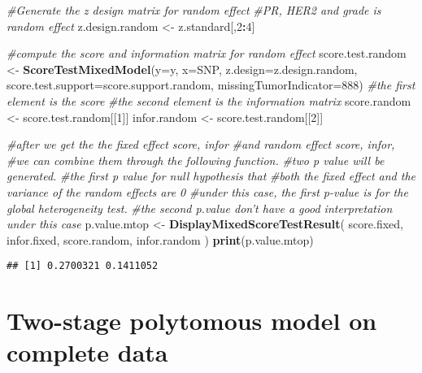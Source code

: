 \documentclass[11pt,]{article}
\newenvironment{Shaded}{\begin{snugshade}}{\end{snugshade}}
\newcommand{\KeywordTok}[1]{\textcolor[rgb]{0.13,0.29,0.53}{\textbf{#1}}}
\newcommand{\DataTypeTok}[1]{\textcolor[rgb]{0.13,0.29,0.53}{#1}}
\newcommand{\DecValTok}[1]{\textcolor[rgb]{0.00,0.00,0.81}{#1}}
\newcommand{\StringTok}[1]{\textcolor[rgb]{0.31,0.60,0.02}{#1}}
\newcommand{\CommentTok}[1]{\textcolor[rgb]{0.56,0.35,0.01}{\textit{#1}}}
\newcommand{\OperatorTok}[1]{\textcolor[rgb]{0.81,0.36,0.00}{\textbf{#1}}}
\newcommand{\NormalTok}[1]{#1}
\begin{document}
\begin{Shaded}
\begin{Highlighting}[]
\CommentTok{#Generate the z design matrix for random effect}
\CommentTok{#PR, HER2 and grade is random effect}
\NormalTok{z.design.random <-}\StringTok{ }\NormalTok{z.standard[,}\DecValTok{2}\OperatorTok{:}\DecValTok{4}\NormalTok{]}

\CommentTok{#compute the score and information matrix for random effect}
\NormalTok{score.test.random <-}\StringTok{ }\KeywordTok{ScoreTestMixedModel}\NormalTok{(}\DataTypeTok{y=}\NormalTok{y,}
                                         \DataTypeTok{x=}\NormalTok{SNP,}
                                         \DataTypeTok{z.design=}\NormalTok{z.design.random,}
                                         \DataTypeTok{score.test.support=}\NormalTok{score.support.random,}
                                         \DataTypeTok{missingTumorIndicator=}\DecValTok{888}\NormalTok{)}
\CommentTok{#the first element is the score}
\CommentTok{#the second element is the information matrix}
\NormalTok{score.random <-}\StringTok{ }\NormalTok{score.test.random[[}\DecValTok{1}\NormalTok{]]}
\NormalTok{infor.random <-}\StringTok{ }\NormalTok{score.test.random[[}\DecValTok{2}\NormalTok{]]}

\CommentTok{#after we get the the fixed effect score, infor }
\CommentTok{#and random effect score, infor, }
\CommentTok{#we can combine them through the following function. }
\CommentTok{#two p value will be generated.}
\CommentTok{#the first p value for null hypothesis that}
\CommentTok{#both the fixed effect and the variance of the random effects are 0}
\CommentTok{#under this case, the first p-value is for the global heterogeneity test.}
\CommentTok{#the second p.value don't have a good interpretation under this case}
\NormalTok{p.value.mtop <-}\StringTok{ }\KeywordTok{DisplayMixedScoreTestResult}\NormalTok{(}
\NormalTok{  score.fixed,}
\NormalTok{  infor.fixed,}
\NormalTok{  score.random,}
\NormalTok{  infor.random}
\NormalTok{)  }
\KeywordTok{print}\NormalTok{(p.value.mtop)}
\end{Highlighting}
\end{Shaded}

\begin{verbatim}
## [1] 0.2700321 0.1411052
\end{verbatim}

\section{Two-stage polytomous model on complete
data}\label{two-stage-polytomous-model-on-complete-data}
\end{document}
